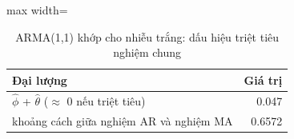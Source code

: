 \begin{table}[H]
\centering\footnotesize
\caption{ARMA(1,1) khớp cho nhiễu trắng: dấu hiệu triệt tiêu nghiệm chung}\label{tab:tab_b11_10_cancellation}
\begin{adjustbox}{max width=\linewidth}
\begin{tabular}{|>{\raggedright\arraybackslash}p{}|r|}
\toprule
Đại lượng & Giá trị \\
\midrule
$\hat{\phi}$ + $\hat{\theta}$ ($\approx$ 0 nếu triệt tiêu) & 0.047 \\[3pt]
khoảng cách giữa nghiệm AR và nghiệm MA & 0.6572 \\[3pt]
\bottomrule
\end{tabular}
\end{adjustbox}
\end{table}
